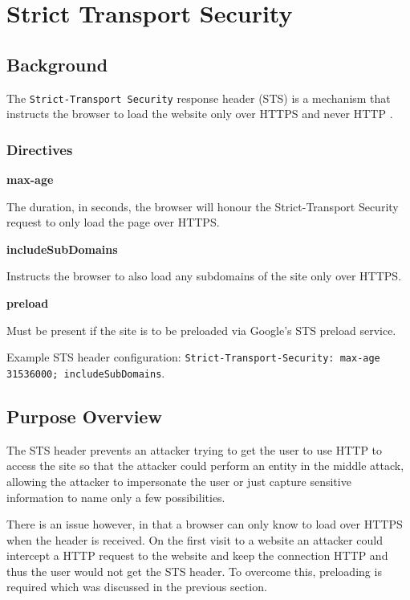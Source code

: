 \documentclass{mscreport}
\begin{document}
\section{Strict Transport Security}
\label{section:STS}

\subsection{Background}

The \texttt{Strict-Transport Security} response header (STS) is a mechanism that instructs the browser to load the website only over HTTPS and never HTTP \cite{Hodges2012-pe}.

\subsubsection{Directives}

\textbf{max-age}

\noindent
The duration, in seconds, the browser will honour the Strict-Transport Security request to only load the page over HTTPS.

\vspace{0.7cm} \noindent
\textbf{includeSubDomains}

\vspace{0.3cm} \noindent
Instructs the browser to also load any subdomains of the site only over HTTPS.

\vspace{0.7cm} \noindent
\textbf{preload}

\vspace{0.3cm} \noindent
Must be present if the site is to be preloaded via Google's STS preload service.

\vspace{0.3cm} \noindent
Example STS header configuration: \texttt{Strict-Transport-Security: max-age 31536000; includeSubDomains}.

\subsection{Purpose Overview}

\noindent
The STS header prevents an attacker trying to get the user to use HTTP to access the site so that the attacker could perform an entity in the middle attack, allowing the attacker to impersonate the user or just capture sensitive information to name only a few possibilities.

\vspace{0.3cm} \noindent
There is an issue however, in that a browser can only know to load over HTTPS when the header is received. On the first visit to a website an attacker could intercept a HTTP request to the website and keep the connection HTTP and thus the user would not get the STS header. To overcome this, preloading is required which was discussed in the previous section.
\end{document}

